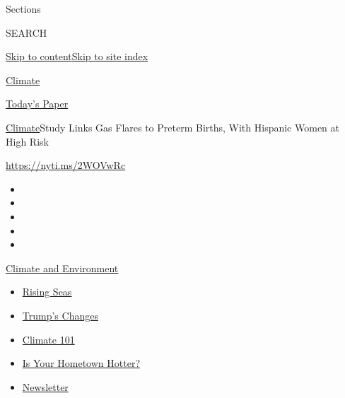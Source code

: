 Sections

SEARCH

\protect\hyperlink{site-content}{Skip to
content}\protect\hyperlink{site-index}{Skip to site index}

\href{https://www.nytimes3xbfgragh.onion/section/climate}{Climate}

\href{https://myaccount.nytimes3xbfgragh.onion/auth/login?response_type=cookie\&client_id=vi}{}

\href{https://www.nytimes3xbfgragh.onion/section/todayspaper}{Today's
Paper}

\href{/section/climate}{Climate}\textbar{}Study Links Gas Flares to
Preterm Births, With Hispanic Women at High Risk

\url{https://nyti.ms/2WOVwRc}

\begin{itemize}
\item
\item
\item
\item
\item
\end{itemize}

\href{https://www.nytimes3xbfgragh.onion/section/climate?action=click\&pgtype=Article\&state=default\&region=TOP_BANNER\&context=storylines_menu}{Climate
and Environment}

\begin{itemize}
\tightlist
\item
  \href{https://www.nytimes3xbfgragh.onion/2020/07/30/climate/sea-level-inland-floods.html?action=click\&pgtype=Article\&state=default\&region=TOP_BANNER\&context=storylines_menu}{Rising
  Seas}
\item
  \href{https://www.nytimes3xbfgragh.onion/interactive/2020/climate/trump-environment-rollbacks.html?action=click\&pgtype=Article\&state=default\&region=TOP_BANNER\&context=storylines_menu}{Trump's
  Changes}
\item
  \href{https://www.nytimes3xbfgragh.onion/interactive/2020/04/19/climate/climate-crash-course-1.html?action=click\&pgtype=Article\&state=default\&region=TOP_BANNER\&context=storylines_menu}{Climate
  101}
\item
  \href{https://www.nytimes3xbfgragh.onion/interactive/2018/08/30/climate/how-much-hotter-is-your-hometown.html?action=click\&pgtype=Article\&state=default\&region=TOP_BANNER\&context=storylines_menu}{Is
  Your Hometown Hotter?}
\item
  \href{https://www.nytimes3xbfgragh.onion/newsletters/climate-change?action=click\&pgtype=Article\&state=default\&region=TOP_BANNER\&context=storylines_menu}{Newsletter}
\end{itemize}

